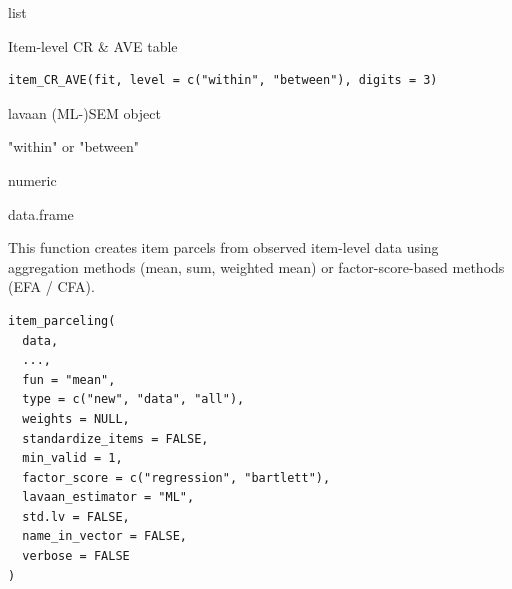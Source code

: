 \documentclass[a4paper]{book}
\begin{document}
%
\begin{Value}
list
\end{Value}
%
\begin{Description}
Item-level CR \& AVE table
\end{Description}
%
\begin{Usage}
\begin{verbatim}
item_CR_AVE(fit, level = c("within", "between"), digits = 3)
\end{verbatim}
\end{Usage}
%
\begin{Arguments}
\begin{ldescription}
\item[\code{fit}] lavaan (ML-)SEM object

\item[\code{level}] "within" or "between"

\item[\code{digits}] numeric
\end{ldescription}
\end{Arguments}
%
\begin{Value}
data.frame
\end{Value}
%
\begin{Description}
This function creates item parcels from observed item-level data using
aggregation methods (mean, sum, weighted mean) or
factor-score-based methods (EFA / CFA).
\end{Description}
%
\begin{Usage}
\begin{verbatim}
item_parceling(
  data,
  ...,
  fun = "mean",
  type = c("new", "data", "all"),
  weights = NULL,
  standardize_items = FALSE,
  min_valid = 1,
  factor_score = c("regression", "bartlett"),
  lavaan_estimator = "ML",
  std.lv = FALSE,
  name_in_vector = FALSE,
  verbose = FALSE
)
\end{verbatim}
\end{Usage}
%
\end{document}

